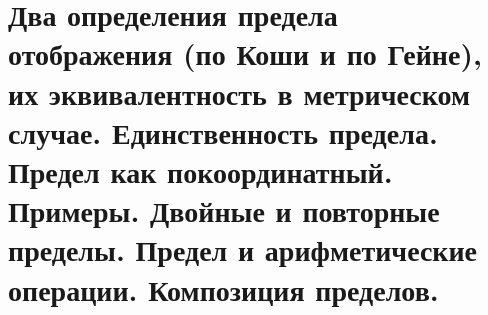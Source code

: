 \documentclass[../main.tex]{subfiles}
\begin{document}
\newpage
\section{Два определения предела отображения (по Коши и по Гейне), их эквивалентность в метрическом случае. Единственность предела. Предел как покоординатный. Примеры. Двойные и повторные пределы. Предел и арифметические операции. Композиция пределов.}
\end{document}
